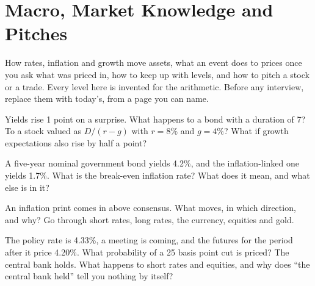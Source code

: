 \chapter{Macro, Market Knowledge and Pitches}\label{ch:iv2:macro-market-knowledge-and-pitches}

\begin{ivtrains}
How rates, inflation and growth move assets, what an event does to prices once you ask what was priced in, how to keep up with levels, and how to pitch a stock or a trade. Every level here is invented for the arithmetic. Before any interview, replace them with today's, from a page you can name.
\end{ivtrains}

\begin{question}\label{iq:iv2:macro-market-knowledge-and-pitches:1}
Yields rise 1 point on a surprise. What happens to a bond with a duration of 7? To a stock valued as $D/(r - g)$ with $r = 8\%$ and $g = 4\%$? What if growth expectations also rise by half a point?
\end{question}

\begin{question}\label{iq:iv2:macro-market-knowledge-and-pitches:2}
A five-year nominal government bond yields 4.2\%, and the inflation-linked one yields 1.7\%. What is the break-even inflation rate? What does it mean, and what else is in it?
\end{question}

\begin{question}\label{iq:iv2:macro-market-knowledge-and-pitches:3}
An inflation print comes in above consensus. What moves, in which direction, and why? Go through short rates, long rates, the currency, equities and gold.
\end{question}

\begin{question}\label{iq:iv2:macro-market-knowledge-and-pitches:4}
The policy rate is 4.33\%, a meeting is coming, and the futures for the period after it price 4.20\%. What probability of a 25 basis point cut is priced? The central bank holds. What happens to short rates and equities, and why does ``the central bank held'' tell you nothing by itself?
\end{question}

